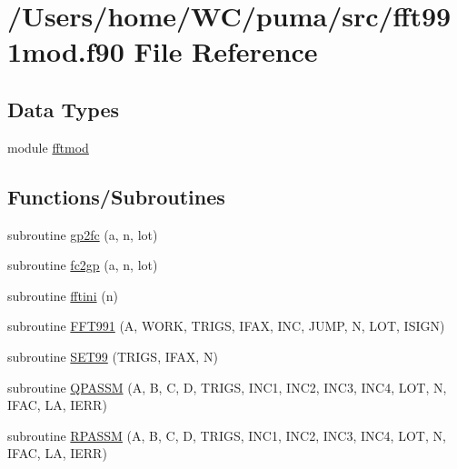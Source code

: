 \hypertarget{fft991mod_8f90}{
\section{/\-Users/home/\-W\-C/puma/src/fft991mod.f90 \-File \-Reference}
\label{fft991mod_8f90}
}
\subsection*{\-Data \-Types}
\begin{DoxyCompactItemize}
\item 
module \hyperlink{classfftmod}{fftmod}
\end{DoxyCompactItemize}
\subsection*{\-Functions/\-Subroutines}
\begin{DoxyCompactItemize}
\item 
subroutine \hyperlink{fft991mod_8f90_a8b611c69cc0d4f2c29a543e7903cb495}{gp2fc} (a, n, lot)
\item 
subroutine \hyperlink{fft991mod_8f90_aa0cf4000171aaaf40d5e9850f73703db}{fc2gp} (a, n, lot)
\item 
subroutine \hyperlink{fft991mod_8f90_a8263c4f24b36fe62f88ab2fb4e1d2152}{fftini} (n)
\item 
subroutine \hyperlink{fft991mod_8f90_a4208e70973023c12c32e4cab13081adb}{\-F\-F\-T991} (\-A, \-W\-O\-R\-K, \-T\-R\-I\-G\-S, \-I\-F\-A\-X, \-I\-N\-C, \-J\-U\-M\-P, \-N, \-L\-O\-T, \-I\-S\-I\-G\-N)
\item 
subroutine \hyperlink{fft991mod_8f90_a3a660d3701dad24e4e8e75bd2be89515}{\-S\-E\-T99} (\-T\-R\-I\-G\-S, \-I\-F\-A\-X, \-N)
\item 
subroutine \hyperlink{fft991mod_8f90_ad40a2639ba9849be91225a116cadd87f}{\-Q\-P\-A\-S\-S\-M} (\-A, \-B, \-C, \-D, \-T\-R\-I\-G\-S, \-I\-N\-C1, \-I\-N\-C2, \-I\-N\-C3, \-I\-N\-C4, \-L\-O\-T, \-N, \-I\-F\-A\-C, \-L\-A, \-I\-E\-R\-R)
\item 
subroutine \hyperlink{fft991mod_8f90_adcdb3d2377fcf2988ef3f1d4a0fdf9af}{\-R\-P\-A\-S\-S\-M} (\-A, \-B, \-C, \-D, \-T\-R\-I\-G\-S, \-I\-N\-C1, \-I\-N\-C2, \-I\-N\-C3, \-I\-N\-C4, \-L\-O\-T, \-N, \-I\-F\-A\-C, \-L\-A, \-I\-E\-R\-R)
\end{DoxyCompactItemize}


